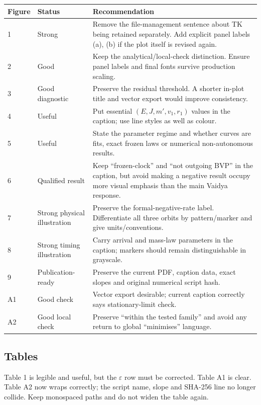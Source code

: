 \documentclass[11pt,a4paper]{article}
\begin{document}
\begin{longtable}{@{}p{}p{}p{}@{}}
\toprule
Figure & Status & Recommendation \\
\midrule
\endhead
1 & Strong & Remove the file-management sentence about TK being retained separately. Add explicit
panel labels (a), (b) if the plot itself is revised again. \\
2 & Good & Keep the analytical/local-check distinction. Ensure panel labels and final fonts survive
production scaling. \\
3 & Good diagnostic & Preserve the residual threshold. A shorter in-plot title and vector export
would improve consistency. \\
4 & Useful & Put essential $(E,J,m',v_1,r_1)$ values in the caption; use line styles as well as
colour. \\
5 & Useful & State the parameter regime and whether curves are fits, exact frozen laws or numerical
non-autonomous results. \\
6 & Qualified result & Keep ``frozen-clock'' and ``not outgoing BVP'' in the caption, but avoid
making a negative result occupy more visual emphasis than the main Vaidya response. \\
7 & Strong physical illustration & Preserve the formal-negative-rate label. Differentiate all three
orbits by pattern/marker and give units/conventions. \\
8 & Strong timing illustration & Carry arrival and mass-law parameters in the caption; markers should
remain distinguishable in grayscale. \\
9 & Publication-ready & Preserve the current PDF, caption data, exact slopes and original numerical
script hash. \\
A1 & Good check & Vector export desirable; current caption correctly says stationary-limit check. \\
A2 & Good local check & Preserve ``within the tested family'' and avoid any return to global
``minimises'' language. \\
\bottomrule
\end{longtable}

\subsection{Tables}

Table 1 is legible and useful, but the $\varepsilon$ row must be corrected. Table A1 is clear.
Table A2 now wraps correctly; the script name, slope and SHA-256 line no longer collide. Keep
monospaced paths and do not widen the table again.
\end{document}
